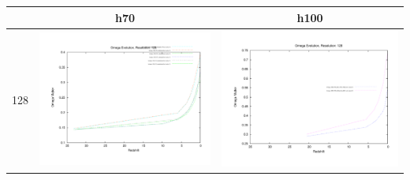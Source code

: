 \begin{itemize}
\begin{table}
\begin{tabular}{l|c|c}
 & h70 & h100 \\
\hline 
 128 & \includegraphics[scale=0.2]{analysis/omega_evolution/omega_evolution_128_h70.pdf} & \includegraphics[scale=0.2]{analysis/omega_evolution/omega_evolution_128_h100.pdf} \\

\end{tabular}
\end{table}
\end{itemize}
